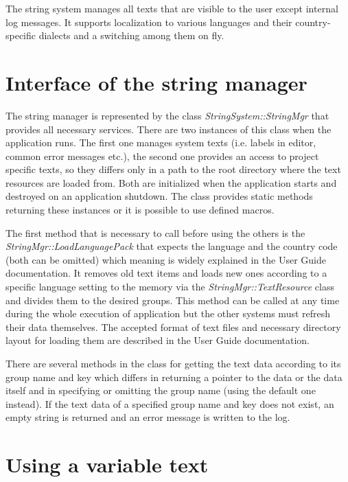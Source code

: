 \documentclass[a4paper, 12pt]{report}
\begin{document}
The string system manages all texts that are visible to the user except internal log messages. It supports localization to various languages and their country-specific dialects and a switching among them on fly.

\section{Interface of the string manager}

The string manager is represented by the class \emph{StringSystem::StringMgr} that provides all necessary services. There are two instances of this class when the application runs. The first one manages system texts (i.e. labels in editor, common error messages etc.), the second one provides an access to project specific texts, so they differs only in a path to the root directory where the text resources are loaded from. Both are initialized when the application starts and destroyed on an application shutdown. The class provides static methods returning these instances or it is possible to use defined macros.

The first method that is necessary to call before using the others is the \emph{StringMgr::LoadLanguagePack} that expects the language and the country code (both can be omitted) which meaning is widely explained in the User Guide documentation.
It removes old text items and loads new ones according to a specific language setting to the memory via the \emph{StringMgr::\-Text\-Resource} class and divides them to the desired groups. This method can be called at any time during the whole execution of application but the other systems must refresh their data themselves. The accepted format of text files and necessary directory layout for loading them are described in the User Guide documentation.

There are several methods in the class for getting the text data according to its group name and key which differs in returning a pointer to the data or the data itself and in specifying or omitting the group name (using the default one instead). If the text data of a specified group name and key does not exist, an empty string is returned and an error message is written to the log.

\section{Using a variable text}
\label{sec:text-format}
\end{document}
